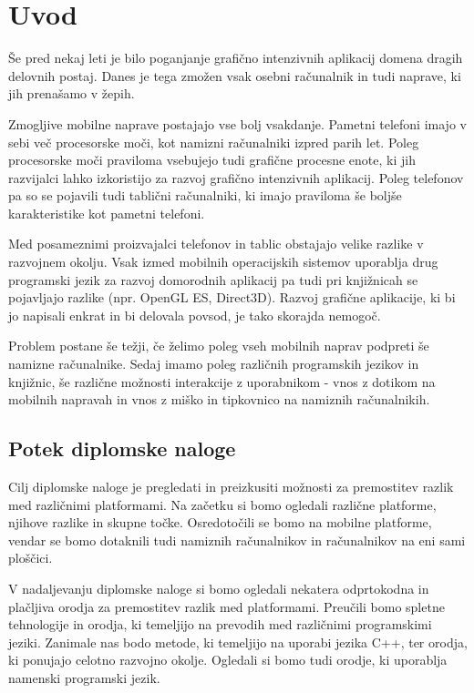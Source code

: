 \chapter{Uvod}

Še pred nekaj leti je bilo poganjanje grafično intenzivnih aplikacij domena dragih delovnih postaj. Danes je tega zmožen vsak osebni računalnik in tudi naprave, ki jih prenašamo v žepih.

Zmogljive mobilne naprave postajajo vse bolj vsakdanje. Pametni telefoni imajo v sebi več procesorske moči, kot namizni računalniki izpred parih let. Poleg procesorske moči praviloma vsebujejo tudi grafične procesne enote, ki jih razvijalci lahko izkoristijo za razvoj grafično intenzivnih aplikacij. Poleg telefonov pa so se pojavili tudi tablični računalniki, ki imajo praviloma še boljše karakteristike kot pametni telefoni. 

Med posameznimi proizvajalci telefonov in tablic obstajajo velike razlike v razvojnem okolju. Vsak izmed mobilnih operacijskih sistemov uporablja drug programski jezik za razvoj domorodnih aplikacij pa tudi pri knjižnicah se pojavljajo razlike (npr. OpenGL ES, Direct3D). Razvoj grafične aplikacije, ki bi jo napisali enkrat in bi delovala povsod, je tako skorajda nemogoč.

Problem postane še težji, če želimo poleg vseh mobilnih naprav podpreti še namizne računalnike. Sedaj imamo poleg različnih programskih jezikov in knjižnic, še različne možnosti interakcije z uporabnikom - vnos z dotikom na mobilnih napravah in vnos z miško in tipkovnico na namiznih računalnikih.

\section{Potek diplomske naloge}

Cilj diplomske naloge je pregledati in preizkusiti možnosti za premostitev razlik med različnimi platformami. Na začetku si bomo ogledali različne platforme, njihove razlike in skupne točke. Osredotočili se bomo na mobilne platforme, vendar se bomo dotaknili tudi namiznih računalnikov in računalnikov na eni sami ploščici.

V nadaljevanju diplomske naloge si bomo ogledali nekatera odprtokodna in plačljiva orodja za premostitev razlik med platformami. Preučili bomo spletne tehnologije in orodja, ki temeljijo na prevodih med različnimi programskimi jeziki. Zanimale nas bodo metode, ki temeljijo na uporabi jezika C++, ter orodja, ki ponujajo celotno razvojno okolje. Ogledali si bomo tudi orodje, ki uporablja namenski programski jezik.

